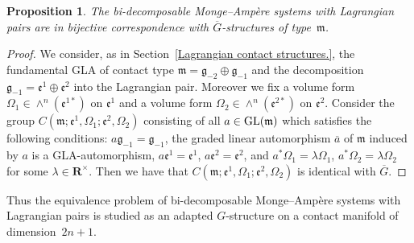 \documentclass[pdftex]{sigma}
\newtheorem{Prop}[Th]{Proposition}
\begin{document}
\begin{Prop}
The bi-decomposable Monge--Amp{\`e}re systems with Lagrangian pairs
are in bijective correspondence with $\overline{G}$-structures of type~$\mathfrak{m}$.
\end{Prop}

\begin{proof}
We consider, as in Section~\ref{Lagrangian contact structures.},
the fundamental GLA of contact type
$\mathfrak{m}= \mathfrak{g}_{-2}\oplus \mathfrak{g}_{-1}$ and
the decomposition
$\mathfrak{g}_{-1}=\mathfrak{e}^1\oplus \mathfrak{e}^2$ into the Lagrangian pair.
Moreover we f\/ix a volume form $\Omega_1 \in \wedge^n(\mathfrak{e}^{1*})$ on $\mathfrak{e}^1$ and
a volume form $\Omega_2 \in \wedge^n(\mathfrak{e}^{2*})$ on $\mathfrak{e}^2$.
Consider the group $C(\mathfrak{m}; \mathfrak{e}^1, \Omega_1; \mathfrak{e}^2, \Omega_2)$
consisting of all $a \in  {\rm GL}(\mathfrak{m})$ which satisf\/ies the following conditions:
$a\mathfrak{g}_{-1} = \mathfrak{g}_{-1}$,
the graded linear automorphism $\overline{a}$ of $\mathfrak{m}$ induced by $a$ is a GLA-automorphism,
$a\mathfrak{e}^1 = \mathfrak{e}^1$, $a\mathfrak{e}^2 = \mathfrak{e}^2$, and
$a^*\Omega_1 = \lambda\Omega_1$, $a^*\Omega_2 = \lambda\Omega_2$ for some $\lambda \in {\mathbf{R}}^{\times}$.
Then we have that $C(\mathfrak{m}; \mathfrak{e}^1, \Omega_1; \mathfrak{e}^2, \Omega_2)$ is identical with
$\overline{G}$.
\end{proof}

Thus the equivalence problem of bi-decomposable Monge--Amp{\`e}re systems with Lagrangian pairs
is studied as an adapted $G$-structure on a contact manifold of dimension~$2n+1$.
\end{document}
